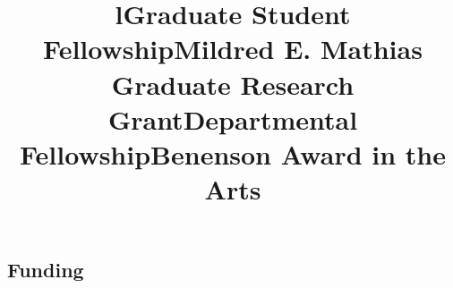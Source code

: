 \documentclass[overlapped,line,letterpaper,10pt]{res}
\begin{document}
\begin{resume}
\section{Funding}\vspace{0.1cm}
\begin{format}
\title{l}\\
\\
\end{format}

\title{Graduate Student Fellowship} 
	\begin{position} \end{position}\vspace{-0.5cm}

\title{Mildred E. Mathias Graduate Research Grant} 
	\begin{position} \end{position}\vspace{-0.5cm}

\title{Departmental Fellowship} 
	\begin{position} \end{position}\vspace{-0.5cm}

\title{Benenson Award in the Arts}
	 
	\begin{position} \end{position}\vspace{-0.5cm}


\end{resume}
\end{document}

